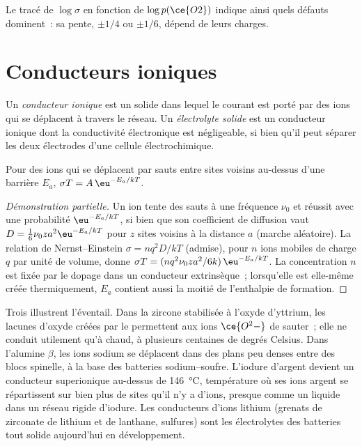 Le tracé de $\log\sigma$ en fonction de $\log p(\ce{O2})$ indique ainsi quels défauts dominent~: sa pente,
$\pm 1/4$ ou $\pm 1/6$, dépend de leurs charges.

\section{Conducteurs ioniques}

\begin{definition}\label{def:b3:solid-state:ionic-conductor}
Un \emph{conducteur ionique} est un solide dans
lequel le courant est porté par des ions qui se déplacent à travers le
réseau. Un \emph{électrolyte solide} est un conducteur ionique
dont la conductivité électronique est négligeable, si bien qu'il peut
séparer les deux électrodes d'une cellule électrochimique.
\end{definition}

\begin{proposition}\label{prop:b3:solid-state:ionic-arrhenius}
Pour des ions qui se déplacent par sauts entre sites voisins au-dessus d'une barrière $E_a$,
$\sigma T = A\,\eu^{-E_a/kT}$.
\end{proposition}

\begin{proof}[Démonstration partielle]
Un ion tente des sauts à une fréquence $\nu_0$ et réussit avec une probabilité $\eu^{-E_a/kT}$,
si bien que son coefficient de diffusion vaut $D = \tfrac16\nu_0 z a^2\eu^{-E_a/kT}$ pour $z$ sites voisins à
la distance $a$ (marche aléatoire). La relation de Nernst--Einstein $\sigma = nq^2D/kT$ (admise), pour $n$
ions mobiles de charge $q$ par unité de volume, donne $\sigma T = (nq^2\nu_0za^2/6k)\,\eu^{-E_a/kT}$. La
concentration $n$ est fixée par le dopage dans un conducteur extrinsèque~;
lorsqu'elle est elle-même créée thermiquement, $E_a$ contient aussi la moitié de l'enthalpie de formation.
\end{proof}

Trois  illustrent l'éventail. Dans la zircone
stabilisée à l'oxyde d'yttrium, les lacunes d'oxyde créées par le 
permettent aux ions $\ce{O^2-}$ de sauter~; elle ne conduit utilement qu'à chaud, à
plusieurs centaines de degrés Celsius. Dans l'alumine $\beta$, les ions sodium se déplacent dans
des plans peu denses entre des blocs spinelle, à la base des batteries
sodium--soufre. L'iodure d'argent devient un conducteur superionique
au-dessus de \qty{146}{\celsius}, température où ses ions argent se
répartissent sur bien plus de sites qu'il n'y a d'ions, presque comme un
liquide dans un réseau rigide d'iodure. Les conducteurs d'ions lithium
(grenats de zirconate de lithium et de lanthane, sulfures) sont les
électrolytes des batteries tout solide aujourd'hui en développement.

